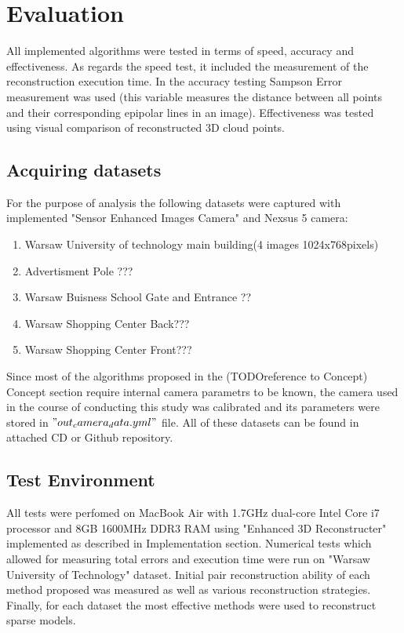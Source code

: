 
\ifpdf
    \graphicspath{{figures/}{figures/comparisons}}
\else
    \graphicspath{{figures/}{figures/comparisons}}
\fi


\chapter{Evaluation} %
All implemented algorithms were tested in terms of speed, accuracy and effectiveness. As regards the speed test, it included the measurement of the reconstruction execution time. In the accuracy testing Sampson Error measurement was used (this variable measures the distance between all points and their corresponding epipolar lines in an image). Effectiveness was tested using visual comparison of reconstructed 3D cloud points.
\section{Acquiring datasets}
For the purpose of analysis the following datasets were captured with implemented "Sensor Enhanced Images Camera" and Nexsus 5 camera:
\begin{enumerate}
\item Warsaw University of technology main building(4 images 1024x768pixels)
\item Advertisment Pole ??? 
\item Warsaw Buisness School Gate and Entrance ??
\item Warsaw Shopping Center Back???
\item Warsaw Shopping Center Front???
\end{enumerate}
Since most of the algorithms proposed in the (TODOreference to Concept) Concept section require internal camera parametrs to be known, the camera used in the course of conducting this study was calibrated and its parameters were stored in $"out_camera_data.yml"$ file. All of these datasets can be found in attached CD or Github repository.
\section{Test Environment}
All tests were perfomed on MacBook Air with 1.7GHz dual-core Intel Core i7 processor and 8GB 1600MHz DDR3 RAM using "Enhanced 3D Reconstructer" implemented as described in Implementation section.  Numerical tests which allowed for measuring total errors and execution time were run on "Warsaw University of Technology" dataset. Initial pair reconstruction ability of each method proposed was measured as well as various reconstruction strategies.  Finally, for each dataset the most effective methods were used to reconstruct sparse models. 
